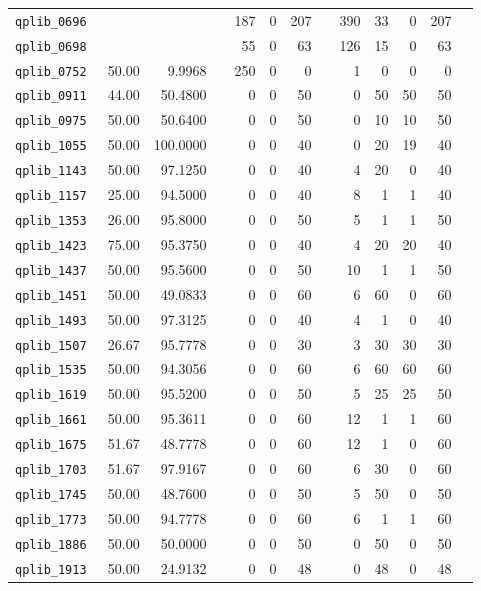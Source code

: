 \begin{longtable}{lrrrrrrrrrrrr}
{\tt 	qplib\_0696	}	&		&		&	&	187	&	0	&	207	&	&	390	&	33	&	0	&	207	\\
{\tt 	qplib\_0698	}	&		&		&	&	55	&	0	&	63	&	&	126	&	15	&	0	&	63	\\
{\tt 	qplib\_0752	}	&	50.00	&	9.9968	&	&	250	&	0	&	0	&	&	1	&	0	&	0	&	0	\\
{\tt 	qplib\_0911	}	&	44.00	&	50.4800	&	&	0	&	0	&	50	&	&	0	&	50	&	50	&	50	\\
{\tt 	qplib\_0975	}	&	50.00	&	50.6400	&	&	0	&	0	&	50	&	&	0	&	10	&	10	&	50	\\
{\tt 	qplib\_1055	}	&	50.00	&	100.0000	&	&	0	&	0	&	40	&	&	0	&	20	&	19	&	40	\\
{\tt 	qplib\_1143	}	&	50.00	&	97.1250	&	&	0	&	0	&	40	&	&	4	&	20	&	0	&	40	\\
{\tt 	qplib\_1157	}	&	25.00	&	94.5000	&	&	0	&	0	&	40	&	&	8	&	1	&	1	&	40	\\
{\tt 	qplib\_1353	}	&	26.00	&	95.8000	&	&	0	&	0	&	50	&	&	5	&	1	&	1	&	50	\\
{\tt 	qplib\_1423	}	&	75.00	&	95.3750	&	&	0	&	0	&	40	&	&	4	&	20	&	20	&	40	\\
{\tt 	qplib\_1437	}	&	50.00	&	95.5600	&	&	0	&	0	&	50	&	&	10	&	1	&	1	&	50	\\
{\tt 	qplib\_1451	}	&	50.00	&	49.0833	&	&	0	&	0	&	60	&	&	6	&	60	&	0	&	60	\\
{\tt 	qplib\_1493	}	&	50.00	&	97.3125	&	&	0	&	0	&	40	&	&	4	&	1	&	0	&	40	\\
{\tt 	qplib\_1507	}	&	26.67	&	95.7778	&	&	0	&	0	&	30	&	&	3	&	30	&	30	&	30	\\
{\tt 	qplib\_1535	}	&	50.00	&	94.3056	&	&	0	&	0	&	60	&	&	6	&	60	&	60	&	60	\\
{\tt 	qplib\_1619	}	&	50.00	&	95.5200	&	&	0	&	0	&	50	&	&	5	&	25	&	25	&	50	\\
{\tt 	qplib\_1661	}	&	50.00	&	95.3611	&	&	0	&	0	&	60	&	&	12	&	1	&	1	&	60	\\
{\tt 	qplib\_1675	}	&	51.67	&	48.7778	&	&	0	&	0	&	60	&	&	12	&	1	&	0	&	60	\\
{\tt 	qplib\_1703	}	&	51.67	&	97.9167	&	&	0	&	0	&	60	&	&	6	&	30	&	0	&	60	\\
{\tt 	qplib\_1745	}	&	50.00	&	48.7600	&	&	0	&	0	&	50	&	&	5	&	50	&	0	&	50	\\
{\tt 	qplib\_1773	}	&	50.00	&	94.7778	&	&	0	&	0	&	60	&	&	6	&	1	&	1	&	60	\\
{\tt 	qplib\_1886	}	&	50.00	&	50.0000	&	&	0	&	0	&	50	&	&	0	&	50	&	0	&	50	\\
{\tt 	qplib\_1913	}	&	50.00	&	24.9132	&	&	0	&	0	&	48	&	&	0	&	48	&	0	&	48	\\

\end{longtable}
